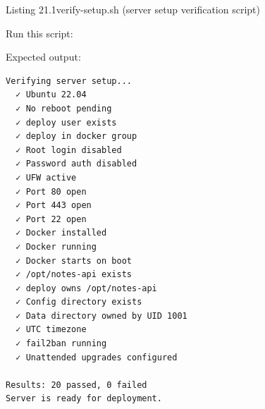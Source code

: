 \begin{codeboxcap}{\textcolor{accent}{Listing 21.1}\enspace verify-setup.sh (server setup verification script)}
\begin{Shaded}
\begin{Highlighting}[]
  
  

 
 
 \BuiltInTok{[}  \BuiltInTok{]}\KeywordTok{;} 
     
     
\end{Highlighting}
\end{Shaded}

\end{codeboxcap}

\noindent{}Run this script:

\begin{codebox}[short]

\begin{Shaded}
\begin{Highlighting}[]
 
\end{Highlighting}
\end{Shaded}

\end{codebox}

\noindent{}Expected output:

\begin{outputbox}
\begin{Verbatim}[fontsize=\codesize, breaklines, breakanywhere, breaksymbolleft={\tiny\textcolor{muted}{$\hookrightarrow$}}]
Verifying server setup...
  ✓ Ubuntu 22.04
  ✓ No reboot pending
  ✓ deploy user exists
  ✓ deploy in docker group
  ✓ Root login disabled
  ✓ Password auth disabled
  ✓ UFW active
  ✓ Port 80 open
  ✓ Port 443 open
  ✓ Port 22 open
  ✓ Docker installed
  ✓ Docker running
  ✓ Docker starts on boot
  ✓ /opt/notes-api exists
  ✓ deploy owns /opt/notes-api
  ✓ Config directory exists
  ✓ Data directory owned by UID 1001
  ✓ UTC timezone
  ✓ fail2ban running
  ✓ Unattended upgrades configured

Results: 20 passed, 0 failed
Server is ready for deployment.
\end{Verbatim}
\end{outputbox}

